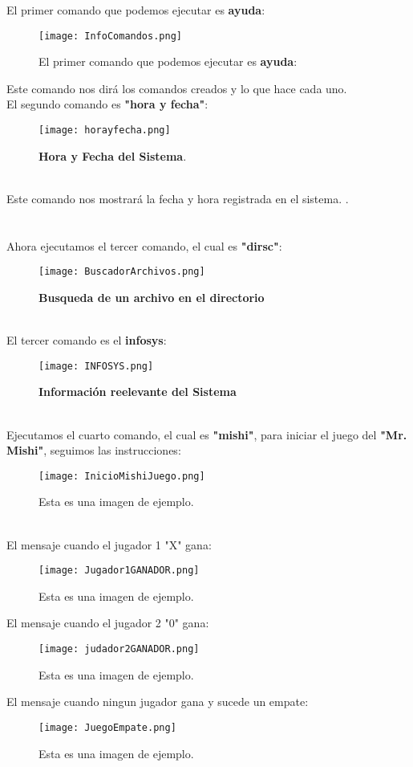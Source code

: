 \documentclass[titlepage]{article}
\begin{document}
El primer comando que podemos ejecutar es \textbf{ayuda}:
\begin{figure}[H]
    \centering
    \texttt{[image: InfoComandos.png]}
    \caption{El primer comando que podemos ejecutar es \textbf{ayuda}:}
    \label{fig:ejemplo}
\end{figure}
Este comando nos dirá los comandos creados y lo que hace cada uno.\\

El segundo comando es \textbf{"hora y fecha"}:
\begin{figure}[H]
    \centering
    \texttt{[image: horayfecha.png]}
    \caption{\textbf{Hora y Fecha del Sistema}.}
    \label{fig:ejemplo}
\end{figure}\\
Este comando nos mostrará la fecha y hora registrada en el sistema.
.\\\\\\

Ahora ejecutamos el tercer comando, el cual es \textbf{"dirsc"}:
\begin{figure}[H]
    \centering
    \texttt{[image: BuscadorArchivos.png]}
    \caption{\textbf{Busqueda de un archivo en el directorio}}
    \label{fig:ejemplo}
\end{figure}\\


El tercer comando es el \textbf{infosys}:
\begin{figure}[H]
    \centering
    \texttt{[image: INFOSYS.png]}
    \caption{\textbf{Información reelevante del Sistema}}
    \label{fig:ejemplo}
\end{figure}\\

Ejecutamos el cuarto comando, el cual es \textbf{"mishi"}, para iniciar el juego del \textbf{"Mr. Mishi"}, seguimos las instrucciones:
\begin{figure}[H]
    \centering
    \texttt{[image: InicioMishiJuego.png]}
    \caption{Esta es una imagen de ejemplo.}
    \label{fig:ejemplo}
\end{figure}\\

El mensaje cuando el jugador 1 "X" gana:
\begin{figure}[H]
    \centering
    \texttt{[image: Jugador1GANADOR.png]}
    \caption{Esta es una imagen de ejemplo.}
    \label{fig:ejemplo}
\end{figure}
El mensaje cuando el jugador 2 "0" gana:
\begin{figure}[H]
    \centering
    \texttt{[image: judador2GANADOR.png]}
    \caption{Esta es una imagen de ejemplo.}
    \label{fig:ejemplo}
\end{figure}
El mensaje cuando ningun jugador gana y sucede un empate:
\begin{figure}[H]
    \centering
    \texttt{[image: JuegoEmpate.png]}
    \caption{Esta es una imagen de ejemplo.}
    \label{fig:ejemplo}
\end{figure}
\end{document}
